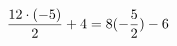\documentclass[preview]{standalone}
\begin{document}
\begin{align*}
\special{dvisvgm:raw <g id='unique000'>}\frac{12 \cdot (-5)}{2} + 4 = 8 (- \frac{5}{2}) - 6\special{dvisvgm:raw </g>}
\end{align*}
\end{document}
